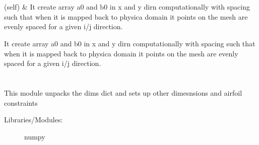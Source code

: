 \documentclass[letterpaper,10pt,english]{sphinxmanual}
\begin{document}
\begin{savenotes}\sphinxatlongtablestart\begin{longtable}[c]{}
\hline

\endfirsthead

%
{}\\
\hline

\endhead

\hline
{}\\
\endfoot

\endlastfoot

\sphinxAtStartPar
{\hyperref[\detokenize{autoapi/coord_strch_func/index:coord_strch_func.coord_stretch}]{}}(self)
&
\sphinxAtStartPar
It create array a0 and b0 in x and y dirn computationally with spacing such that when it is mapped back to physica domain it points on the mesh are evenly spaced for a given i/j direction.
\\
\hline
\end{longtable}\sphinxatlongtableend\end{savenotes}

\begin{fulllineitems}
\label{\detokenize{autoapi/coord_strch_func/index:coord_strch_func.coord_stretch}}
\sphinxAtStartPar
It create array a0 and b0 in x and y dirn computationally with spacing such that when it is mapped back to physica domain it points on the mesh are evenly spaced for a given i/j direction.

\end{fulllineitems}



\section{}
\label{\detokenize{autoapi/dims_func/index:module-dims_func}}\label{\detokenize{autoapi/dims_func/index:dims-func}}\label{\detokenize{autoapi/dims_func/index::doc}}
\sphinxAtStartPar
This module unpacks the dims dict and sets up other dimesnsions and airfoil constraints
\begin{description}
\item[{Libraries/Modules:}] \leavevmode
\sphinxAtStartPar
numpy

\end{description}
\end{document}
